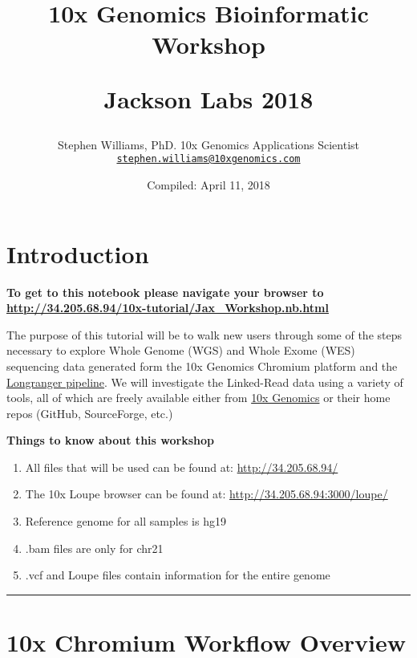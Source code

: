 \documentclass[]{article}
\title{10x Genomics Bioinformatic Workshop

Jackson Labs 2018}
\author{Stephen Williams, PhD. 10x Genomics Applications Scientist
\href{mailto:stephen.williams@10xgenomics.com}{\nolinkurl{stephen.williams@10xgenomics.com}}}
\date{Compiled: April 11, 2018}
\providecommand{\tightlist}{%
  \setlength{\itemsep}{0pt}\setlength{\parskip}{0pt}}
\begin{document}
\maketitle

{
\setcounter{tocdepth}{3}
\tableofcontents
}
\section{\texorpdfstring{\textbf{Introduction}}{Introduction}}\label{introduction}

\textbf{To get to this notebook please navigate your browser to
\url{http://34.205.68.94/10x-tutorial/Jax_Workshop.nb.html} }

The purpose of this tutorial will be to walk new users through some of
the steps necessary to explore Whole Genome (WGS) and Whole Exome (WES)
sequencing data generated form the 10x Genomics Chromium platform and
the
\href{https://support.10xgenomics.com/genome-exome/software/pipelines/latest/what-is-long-ranger}{Longranger
pipeline}. We will investigate the Linked-Read data using a variety of
tools, all of which are freely available either from
\href{https://support.10xgenomics.com/genome-exome/software/overview/welcome}{10x
Genomics} or their home repos (GitHub, SourceForge, etc.)

\textbf{Things to know about this workshop}

\begin{enumerate}
\def\labelenumi{\arabic{enumi}.}
\tightlist
\item
  All files that will be used can be found at:
  \url{http://34.205.68.94/}
\item
  The 10x Loupe browser can be found at:
  \url{http://34.205.68.94:3000/loupe/}
\item
  Reference genome for all samples is hg19
\item
  .bam files are only for chr21
\item
  .vcf and Loupe files contain information for the entire genome
\end{enumerate}

\begin{center}\rule{0.5\linewidth}{\linethickness}\end{center}

\section{\texorpdfstring{\textbf{10x Chromium Workflow
Overview}}{10x Chromium Workflow Overview}}\label{x-chromium-workflow-overview}
\end{document}
